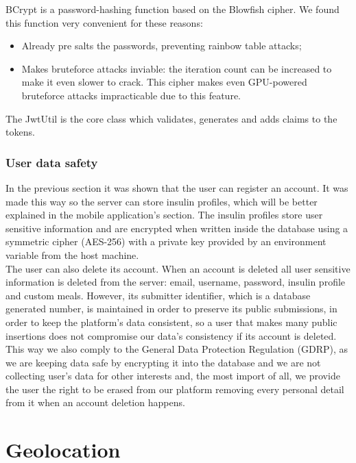 BCrypt is a password-hashing function based on the Blowfish\cite{blowfish} cipher. We found this function very convenient for these reasons:
\begin{itemize}
    \item Already pre salts the passwords, preventing rainbow table attacks\cite{rainbowtable};
    \item Makes bruteforce attacks inviable: the iteration count can be increased to make it even slower to crack.
    This cipher makes even GPU-powered bruteforce attacks impracticable due to this feature.
\end{itemize}

The JwtUtil is the core class which validates, generates and adds claims to the tokens.\\

\subsubsection{User data safety}

In the previous section it was shown that the user can register an account. It was made this way so the server can store
insulin profiles, which will be better explained in the mobile application's section. The insulin profiles store user sensitive
information and are encrypted when written inside the database using a symmetric cipher (AES-256) with a private key provided by an 
environment variable from the host machine.\\

The user can also delete its account. When an account is deleted all user sensitive information is deleted from the server: email,
username, password, insulin profile and custom meals. However, its submitter identifier, which is a database generated number,
is maintained in order to preserve its public submissions, in order to keep the platform's data consistent, so a user that makes many 
public insertions does not compromise our data's consistency if its account is deleted.\\

This way we also comply to the General Data Protection Regulation (GDRP), as we are keeping data safe by encrypting it into the database and
we are not collecting user's data for other interests and, the most import of all, we provide the user the right to be erased from our 
platform removing every personal detail from it when an account deletion happens.\\

\section{Geolocation}

